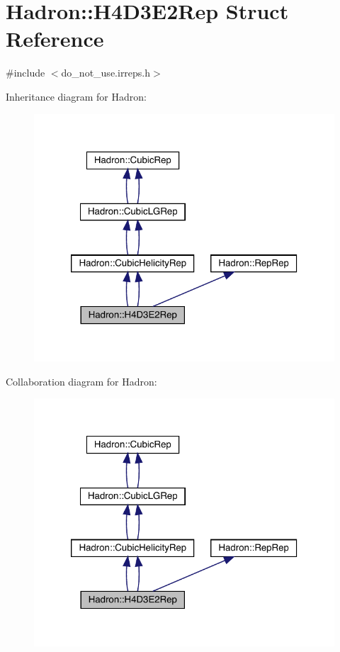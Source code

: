 \hypertarget{structHadron_1_1H4D3E2Rep}{}\section{Hadron\+:\+:H4\+D3\+E2\+Rep Struct Reference}
\label{structHadron_1_1H4D3E2Rep}


{\ttfamily \#include $<$do\+\_\+not\+\_\+use.\+irreps.\+h$>$}



Inheritance diagram for Hadron\+:\nopagebreak
\begin{figure}[H]
\begin{center}
\leavevmode
\includegraphics[width=320pt]{db/dd2/structHadron_1_1H4D3E2Rep__inherit__graph}
\end{center}
\end{figure}


Collaboration diagram for Hadron\+:\nopagebreak
\begin{figure}[H]
\begin{center}
\leavevmode
\includegraphics[width=320pt]{d2/d24/structHadron_1_1H4D3E2Rep__coll__graph}
\end{center}
\end{figure}
